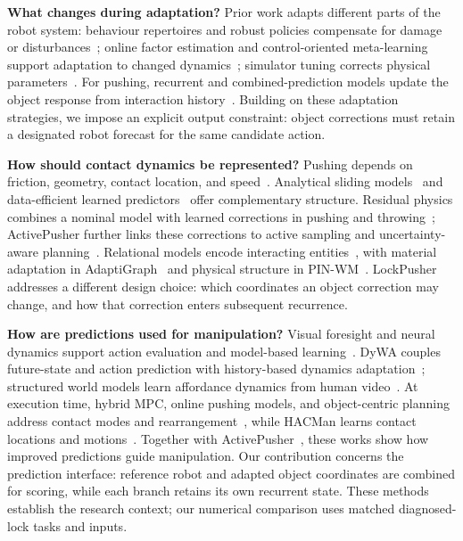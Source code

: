 \textbf{What changes during adaptation?} Prior work adapts different parts of the robot system: behaviour repertoires and robust policies compensate for damage or disturbances~\cite{cully2015robots,yang2021fault}; online factor estimation and control-oriented meta-learning support adaptation to changed dynamics~\cite{kumar2021rma,richards2021adaptive}; simulator tuning corrects physical parameters~\cite{allevato2020tunenet}. For pushing, recurrent and combined-prediction models update the object response from interaction history~\cite{cong2020self,gao2019online,li2018pushnet}. Building on these adaptation strategies, we impose an explicit output constraint: object corrections must retain a designated robot forecast for the same candidate action.

\textbf{How should contact dynamics be represented?} Pushing depends on friction, geometry, contact location, and speed~\cite{yu2016million}. Analytical sliding models~\cite{zhou2018convexpolynomial} and data-efficient learned predictors~\cite{bauza2018data,kim2023se2} offer complementary structure. Residual physics combines a nominal model with learned corrections in pushing and throwing~\cite{ajay2018augmenting,zeng2020tossingbot}; ActivePusher further links these corrections to active sampling and uncertainty-aware planning~\cite{zhong2026activepusher}. Relational models encode interacting entities~\cite{battaglia2016interaction,sanchezgonzalez2020learning}, with material adaptation in AdaptiGraph~\cite{zhang2024adaptigraph} and physical structure in PIN-WM~\cite{li2025pinwm}. LockPusher addresses a different design choice: which coordinates an object correction may change, and how that correction enters subsequent recurrence.

\textbf{How are predictions used for manipulation?} Visual foresight and neural dynamics support action evaluation and model-based learning~\cite{finn2017visual,nagabandi2018neural}. DyWA couples future-state and action prediction with history-based dynamics adaptation~\cite{lyu2025dywa}; structured world models learn affordance dynamics from human video~\cite{mendonca2023structured}. At execution time, hybrid MPC, online pushing models, and object-centric planning address contact modes and rearrangement~\cite{hogan2020reactive,wang2024unopush,ren2025objectcentric}, while HACMan learns contact locations and motions~\cite{zhou2023hacman}. Together with ActivePusher~\cite{zhong2026activepusher}, these works show how improved predictions guide manipulation. Our contribution concerns the prediction interface: reference robot and adapted object coordinates are combined for scoring, while each branch retains its own recurrent state. These methods establish the research context; our numerical comparison uses matched diagnosed-lock tasks and inputs.
